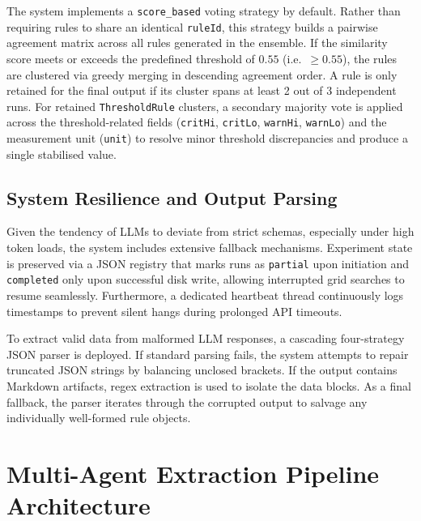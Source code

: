 ﻿\documentclass[11pt]{article}
\begin{document}
The system implements a \texttt{score\_based} voting strategy by default. Rather
than requiring rules to share an identical \texttt{ruleId}, this strategy builds a
pairwise agreement matrix across all rules generated in the ensemble. If the
similarity score meets or exceeds the predefined threshold of $0.55$
(i.e.\ $\geq 0.55$), the rules are clustered via greedy merging in descending
agreement order. A rule is only retained
for the final output if its cluster spans at least 2 out of 3 independent runs.
For retained \texttt{ThresholdRule} clusters, a secondary majority vote is applied
across the threshold-related fields (\texttt{critHi}, \texttt{critLo},
\texttt{warnHi}, \texttt{warnLo}) and the measurement unit (\texttt{unit}) to
resolve minor threshold discrepancies and produce a single stabilised value.

\subsection{System Resilience and Output Parsing}
Given the tendency of LLMs to deviate from strict schemas, especially under high
token loads, the system includes extensive fallback mechanisms. Experiment state is
preserved via a JSON registry that marks runs as \texttt{partial} upon initiation
and \texttt{completed} only upon successful disk write, allowing interrupted grid
searches to resume seamlessly. Furthermore, a dedicated heartbeat thread
continuously logs timestamps to prevent silent hangs during prolonged API timeouts.

To extract valid data from malformed LLM responses, a cascading four-strategy JSON
parser is deployed. If standard parsing fails, the system attempts to repair
truncated JSON strings by balancing unclosed brackets. If the output contains
Markdown artifacts, regex extraction is used to isolate the data blocks. As a final
fallback, the parser iterates through the corrupted output to salvage any
individually well-formed rule objects.

\section{Multi-Agent Extraction Pipeline Architecture}
\label{sec:pipeline}
\end{document}
